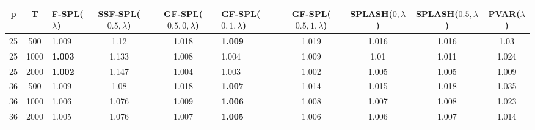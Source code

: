 \begin{tabular}{cclcclcccc}
\hline
  p  &  T   & F-SPL($\lambda$)   &  SSF-SPL($0.5, \lambda$)  &  GF-SPL($0.5, 0, \lambda$)  & GF-SPL($0, 1, \lambda$)   &  GF-SPL($0.5, 1, \lambda$)  &  SPLASH($0, \lambda$)  &  SPLASH($0.5, \lambda$)  &  PVAR($\lambda$)  \\
\hline
 25  & 500  & 1.009              &           1.12            &            1.018            & \textbf{1.009}            &            1.019            &         1.016          &          1.016           &       1.03        \\
 25  & 1000 & \textbf{1.003}     &           1.133           &            1.008            & 1.004                     &            1.009            &          1.01          &          1.011           &       1.024       \\
 25  & 2000 & \textbf{1.002}     &           1.147           &            1.004            & 1.003                     &            1.002            &         1.005          &          1.005           &       1.009       \\
 36  & 500  & 1.009              &           1.08            &            1.018            & \textbf{1.007}            &            1.014            &         1.015          &          1.018           &       1.035       \\
 36  & 1000 & 1.006              &           1.076           &            1.009            & \textbf{1.006}            &            1.008            &         1.007          &          1.008           &       1.023       \\
 36  & 2000 & 1.005              &           1.076           &            1.007            & \textbf{1.005}            &            1.006            &         1.006          &          1.007           &       1.014       \\
\hline
\end{tabular}